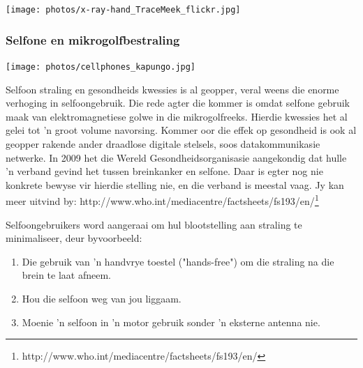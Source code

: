 \begin{minipage}{.5\textwidth}\begin{center}
 \texttt{[image: photos/x-ray-hand\_TraceMeek\_flickr.jpg]}\end{center}
\end{minipage}

            \subsubsection*{Selfone en mikrogolfbestraling}
            \nopagebreak
\begin{minipage}{.5\textwidth}
\texttt{[image: photos/cellphones\_kapungo.jpg]}
\end{minipage}
\begin{minipage}{.5\textwidth}
            \label{m38779*id189654} Selfoon straling en gesondheids kwessies is al geopper, veral weens die enorme verhoging in selfoongebruik. Die rede agter die kommer is omdat selfone gebruik maak van elektromagnetiese golwe in die mikrogolfreeks. Hierdie kwessies het al gelei tot 'n groot volume navorsing. Kommer oor die effek op gesondheid is ook al geopper rakende ander draadlose digitale stelsels, soos datakommunikasie netwerke. 
In 2009 het die Wereld Gesondheidsorganisasie aangekondig dat hulle 'n verband gevind het tussen breinkanker en selfone. Daar is egter nog nie konkrete bewyse vir hierdie stelling nie, en die verband is meestal vaag. Jy kan meer uitvind by: http://www.who.int/mediacentre/factsheets/fs193/en/\footnote{http://www.who.int/mediacentre/factsheets/fs193/en/}
        \par 
\end{minipage}
        \label{m38779*id189664} Selfoongebruikers word aangeraai om hul blootstelling aan straling te minimaliseer, deur byvoorbeeld:\par 
        \label{m38779*id189668}\begin{enumerate}[noitemsep, label=\textbf{\arabic*}. ] 
            \label{m38779*uid24}\item Die gebruik van 'n handvrye toestel ("hands-free") om die straling na die brein te laat afneem.
\label{m38779*uid25}\item Hou die selfoon weg van jou liggaam.
\label{m38779*uid26}\item Moenie 'n selfoon in 'n motor gebruik sonder 'n eksterne antenna nie. 
\end{enumerate}
        \label{m38779*uid27}

